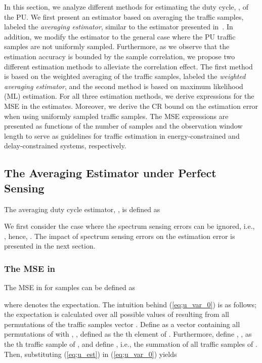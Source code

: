 \documentclass[11pt,draftclsnofoot,journal,onecolumn]{IEEEtran}
\begin{document}
In this section, we analyze different methods for estimating the duty cycle, , of the PU. We first present an estimator based on averaging the traffic samples, labeled the \emph{averaging estimator}, similar to the estimator presented in~\cite{kim_tmc_2008,kim_dyspan_2008,liang_ita_2010,liang_tmc_2011}. In addition, we modify the estimator to the general case where the PU traffic samples are not uniformly sampled. Furthermore, as we observe that the estimation accuracy is bounded by the sample correlation, we propose two different estimation methods to alleviate the correlation effect. The first method is based on the weighted averaging of the traffic samples, labeled the \emph{weighted averaging estimator}, and the second method is based on maximum likelihood (ML) estimation. For all three estimation methods, we derive expressions for the MSE in the estimates. Moreover, we derive the CR bound on the estimation error when using uniformly sampled traffic samples. The MSE expressions are presented as functions of the number of samples and the observation window length to serve as guidelines for traffic estimation in energy-constrained and delay-constrained systems, respectively.

\subsection{The Averaging Estimator under Perfect Sensing}
\label{sec:estimation_u}

The averaging duty cycle estimator, , is defined as ~\cite[Sec. 6.1]{kim_tmc_2008}

We first consider the case where the spectrum sensing errors can be ignored, i.e., , hence, . The impact of spectrum sensing errors on the estimation error is presented in the next section.

\subsubsection{The MSE in }
\label{sec:mse_u_non_uni}

The MSE in  for  samples can be defined as

where  denotes the expectation. The intuition behind (\ref{eq;u_var_0}) is as follows; the expectation is calculated over all possible values of  resulting from all  permutations of the traffic samples vector . Define  as a vector containing all  permutations of  with , , defined as the th element of . Furthermore, define , , as the th traffic sample of , and define , i.e., the summation of all traffic samples of . Then, substituting (\ref{eq;u_est}) in (\ref{eq;u_var_0}) yields
\end{document}
